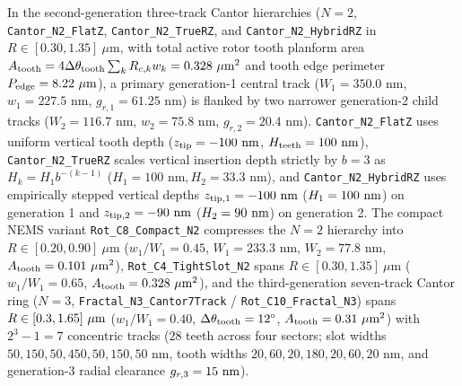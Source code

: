 \documentclass[pdflatex,sn-nature]{sn-jnl}
\DeclareRobustCommand{\roundtwo}[1]{\fpeval{round(#1,2)}}
\DeclareRobustCommand{\roundthree}[1]{\fpeval{round(#1,3)}}
\begin{document}
In the second-generation three-track Cantor hierarchies ($N=2$, \texttt{Cantor\_N2\_FlatZ}, \texttt{Cantor\_N2\_TrueRZ}, and \texttt{Cantor\_N2\_HybridRZ} in $R \in [0.30, 1.35]\ \mu\text{m}$, with total active rotor tooth planform area $A_{\rm tooth} = 4\Delta\theta_{\rm tooth}\sum_k R_{c,k} w_k = \roundthree{\FractalCantorFlatzActiveToothAreaUmtwo}\ \mu\text{m}^2$ and tooth edge perimeter $P_{\rm edge} = \roundtwo{\FractalCantorFlatzEdgePerimeterUm}\ \mu\text{m}$), a primary generation-1 central track ($W_1 = 350.0\text{ nm}$, $w_1 = 227.5\text{ nm}$, $g_{r,1} = 61.25\text{ nm}$) is flanked by two narrower generation-2 child tracks ($W_2 = 116.7\text{ nm}$, $w_2 = 75.8\text{ nm}$, $g_{r,2} = 20.4\text{ nm}$). \texttt{Cantor\_N2\_FlatZ} uses uniform vertical tooth depth ($z_{\rm tip} = -100\text{ nm}$, $H_{\rm teeth} = 100\text{ nm}$), \texttt{Cantor\_N2\_TrueRZ} scales vertical insertion depth strictly by $b=3$ as $H_k = H_1 b^{-(k-1)}$ ($H_1 = 100\text{ nm}, H_2 = 33.3\text{ nm}$), and \texttt{Cantor\_N2\_HybridRZ} uses empirically stepped vertical depths $z_{\rm tip,1} = -100{}\text{ nm}$ ($H_1 = 100{}\text{ nm}$) on generation 1 and $z_{\rm tip,2} = -90{}\text{ nm}$ ($H_2 = 90{}\text{ nm}$) on generation 2. The compact NEMS variant \texttt{Rot\_C8\_Compact\_N2} compresses the $N=2$ hierarchy into $R \in [0.20, 0.90]\ \mu\text{m}$ ($w_1/W_1 = 0.45$, $W_1 = 233.3\text{ nm}$, $W_2 = 77.8\text{ nm}$, $A_{\rm tooth} = \roundthree{\RotCeightCompactNtwoStandardThetaZerofoureightpzeroPolarOverlapUmtwo}\ \mu\text{m}^2$), \texttt{Rot\_C4\_TightSlot\_N2} spans $R \in [0.30, 1.35]\ \mu\text{m}$ ($w_1/W_1 = 0.65$, $A_{\rm tooth} = \roundthree{\RotCfourTightslotNtwoHighThetaZerofoureightpzeroPolarOverlapUmtwo}\ \mu\text{m}^2$), and the third-generation seven-track Cantor ring ($N=3$, \texttt{Fractal\_N3\_Cantor7Track} / \texttt{Rot\_C10\_Fractal\_N3}) spans $R \in [0.3{}, 1.65{}]\ \mu\text{m}$ ($w_1/W_1 = 0.40$, $\Delta\theta_{\rm tooth} = 12^\circ$, $A_{\rm tooth} = \roundthree{\RotConezeroFractalNthreeStandardThetaZerofoureightpzeroPolarOverlapUmtwo}\ \mu\text{m}^2$) with $2^3 - 1 = 7$ concentric tracks ($28$ teeth across four sectors; slot widths $50, 150, 50, 450, 50, 150, 50\text{ nm}$, tooth widths $20, 60, 20, 180, 20, 60, 20\text{ nm}$, and generation-3 radial clearance $g_{r,3} = 15{}\text{ nm}$).
\end{document}
